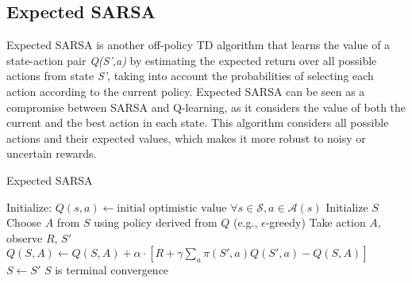 \subsection{Expected SARSA}
Expected SARSA is another off-policy TD algorithm that learns the value of a state-action pair \textit{Q(S',a)} by estimating the expected return over all possible actions from state \textit{S'}, taking into account the probabilities of selecting each action according to the current policy. Expected SARSA can be seen as a compromise between SARSA and Q-learning, as it considers the value of both the current and the best action in each state. This algorithm considers all possible actions and their expected values, which makes it more robust to noisy or uncertain rewards. 
\begin{algorithm}
\caption{Expected SARSA}\label{algo:ES}
\begin{algorithmic}[1]
\State Initialize:
\State \hspace{0.5cm} $Q(s,a) \gets \text{initial optimistic value } \forall s\in \mathcal{S}, a\in \mathcal{A}(s)$
\Repeat
\State Initialize $S$
\Repeat
\State Choose $A$ from $S$ using policy derived from $Q$ (e.g., $\epsilon$-greedy)
\State Take action $A$, observe $R$, $S'$
\State $Q(S,A) \gets Q(S,A) + \alpha \cdot [R + \gamma\sum_{a}\pi(S', a)Q(S',a) - Q(S,A)]$
\State $S \gets S'$
\Until $S$ is terminal
\Until convergence
\end{algorithmic}
\end{algorithm}

